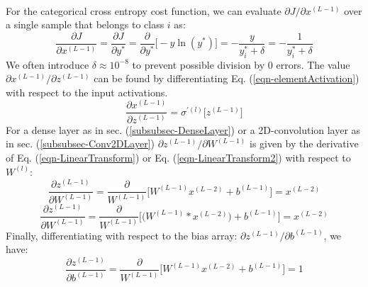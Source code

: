 \documentclass[12pt,letterpaper]{article}
\begin{document}
\paragraph*{}For the categorical cross entropy cost function, we can evaluate $\partial J / \partial x^{(L-1)}$ over a single sample that belongs to class $i$ as:
\begin{equation}
\label{eqn-CXELossDeriv}
\frac{\partial J}{\partial x^{(L-1)}} = \frac{\partial J}{\partial y^*} =
\frac{\partial}{\partial y^*}\Big[ -y \ln (y^*) \Big] = -\frac{y}{y^*_i + \delta} = -\frac{1}{y^*_i + \delta}
\end{equation}
We often introduce $\delta \approx 10^{-8}$ to prevent possible division by $0$ errors. The value $\partial x^{(L-1)} / \partial z^{(L-1)}$ can be found by differentiating Eq. (\ref{eqn-elementActivation}) with respect to the input activations.
\begin{equation}
\frac{\partial x^{(L-1)}}{\partial z^{(L-1)}} = \sigma^{'(l)} \big[ z^{(L-1)} \big]
\end{equation}
For a dense layer as in sec. (\ref{subsubsec-DenseLayer}) or a 2D-convolution layer as in sec. (\ref{subsubsec-Conv2DLayer}) $\partial z^{(L-1)} / \partial W^{(L-1)}$ is given by the derivative of Eq. (\ref{eqn-LinearTransform}) or Eq. (\ref{eqn-LinearTransform2}) with respect to $W^{(l)}$:
\begin{equation}
\frac{\partial z^{(L-1)}}{\partial W^{(L-1)}} = 
\frac{\partial}{W^{(L-1)}}\Big[ W^{(L-1)}x^{(L-2)} + b^{(L-1)}\Big] = x^{(L-2)}
\end{equation}
\begin{equation}
\frac{\partial z^{(L-1)}}{\partial W^{(L-1)}} = 
\frac{\partial}{W^{(L-1)}}\Big[ \big( W^{(L-1)} * x^{(L-2)} \big) + b^{(L-1)}\Big] = x^{(L-2)}
\end{equation}
Finally, differentiating with respect to the bias array: $\partial z^{(L-1)} / \partial b^{(L-1)}$, we have:
\begin{equation}
\frac{\partial z^{(L-1)}}{\partial b^{(L-1)}} = \frac{\partial}{W^{(L-1)}}\Big[ W^{(L-1)}x^{(L-2)} + b^{(L-1)}\Big] = 1
\end{equation}
\end{document}
